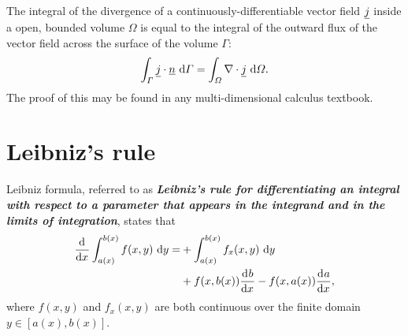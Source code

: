\begin{theorem}
\label{divergence_theorem}
The integral of the divergence of a continuously-differentiable vector field $\underline{j}$ inside a open, bounded volume $\Omega$ is equal to the integral of the outward flux of the vector field across the surface of the volume $\Gamma$:
\begin{align*}
  \int_{\varGamma} \underline{j} \cdot \underline{n} \ \mathrm{d}\varGamma = \int_{\varOmega} \nabla \cdot \underline{j} \ \mathrm{d}\varOmega.
\end{align*}
The proof of this may be found in any multi-dimensional calculus textbook.
\end{theorem}

\section{Leibniz's rule} \label{ssn_liebniz_rule}

\begin{theorem}
\label{leibniz_rule}
Leibniz formula, referred to as \textbf{\emph{Leibniz's rule for differentiating an integral with respect to a parameter that appears in the integrand and in the limits of integration}}, states that
\begin{align*}
  \frac{\mathrm{d}{^{}} }{\mathrm{d} x{^{}} } \int_{a(x)}^{b(x)} f(x,y) \ \mathrm{d}y = &+ \int_{a(x)}^{b(x)} f_x(x,y) \ \mathrm{d}y \notag \\
  &+ f(x,b(x)) \frac{\mathrm{d}{^{}} b}{\mathrm{d} x{^{}} } - f(x,a(x))\frac{\mathrm{d}{^{}} a}{\mathrm{d} x{^{}} },
\end{align*}
where $f(x,y)$ and $f_x(x,y)$ are both continuous over the finite domain $y \in [a(x),b(x)]$.
\end{theorem}


